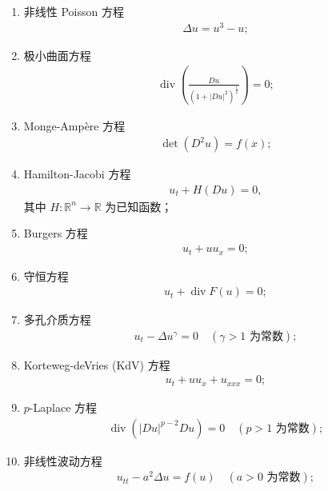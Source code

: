 \documentclass[../../main.tex]{subfiles}%
\begin{document}
\begin{examples}[较著名的一些非线性偏微分方程]
\begin{enumerate}[(1)]
\item 非线性 Poisson 方程
\begin{align*}
\Delta u = u^3 - u;
\end{align*}

\item 极小曲面方程
\begin{align*}
\operatorname{div}\left( \frac{D u}{(1 + |D u|^2)^{\frac{1}{2}}} \right) = 0;
\end{align*}

\item Monge-Amp\`{e}re 方程
\begin{align*}
\det(D^2 u) = f(x);
\end{align*}

\item Hamilton-Jacobi 方程
\begin{align*}
u_t + H(Du) = 0,
\end{align*}
其中 $H:\mathbb{R}^n\to\mathbb{R}$ 为已知函数；

\item Burgers 方程
\begin{align*}
u_t + u u_x = 0;
\end{align*}

\item 守恒方程
\begin{align*}
u_t + \operatorname{div} F(u) = 0;
\end{align*}

\item 多孔介质方程
\begin{align*}
u_t - \Delta u^\gamma = 0 \quad (\gamma > 1 \text{ 为常数});
\end{align*}

\item Korteweg-deVries (KdV) 方程
\begin{align*}
u_t + u u_x + u_{xxx} = 0;
\end{align*}

\item $p$-Laplace 方程
\begin{align*}
\operatorname{div} (|D u|^{p-2} D u) = 0 \quad (p > 1 \text{ 为常数});
\end{align*}

\item 非线性波动方程
\begin{align*}
u_{tt} - a^2 \Delta u = f(u) \quad (a > 0 \text{ 为常数});
\end{align*}


\end{enumerate}
\end{examples}
\end{document}
